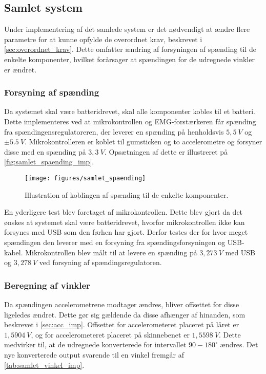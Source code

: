\subsection{Samlet system} \label{sec:samlet_system}
Under implementering af det samlede system er det nødvendigt at ændre flere parametre for at kunne opfylde de overordnet krav, beskrevet i  \autoref{sec:overordnet_krav}. Dette omfatter ændring af forsyningen af spænding til de enkelte komponenter, hvilket forårsager at spændingen for de udregnede vinkler er ændret.

\subsubsection{Forsyning af spænding}
Da systemet skal være batteridrevet, skal alle komponenter kobles til et batteri. Dette implementeres ved at mikrokontrollen og EMG-forstærkeren får spænding fra spændingensregulatoreren, der leverer en spænding på henholdsvis $5,5~V$ og $\pm 5.5~V$. Mikrokontrolleren er koblet til gumsticken og to accelerometre og forsyner disse med en spænding på $3,3~V$. Opsætningen af dette er illustreret på \autoref{fig:samlet_spaending_imp}. 

\begin{figure}[H]
\centering
\texttt{[image: figures/samlet\_spaending]}
\caption{Illustration af koblingen af spænding til de enkelte komponenter.}
\label{fig:samlet_spaending_imp}
\end{figure}

En yderligere test blev foretaget af mikrokontrollen. Dette blev gjort da det ønskes at systemet skal være batteridrevet, hvorfor mikrokontrollen ikke kan forsynes med USB som den førhen har gjort. Derfor testes der for hvor meget spændingen den leverer med en forsyning fra spændingsforsyningen og USB-kabel. Mikrokontrollen blev målt til at levere en spænding på $3,273~V$ med USB og $3,278~V$ ved forsyning af spændingsregulatoren.

\subsubsection{Beregning af vinkler}
Da spændingen accelerometrene modtager ændres, bliver offsettet for disse ligeledes ændret. Dette gør sig gældende da disse afhænger af hinanden, som  beskrevet i \autoref{sec:acc_imp}. Offsettet for accelerometeret placeret på låret er $1,5904~V$, og for accelerometeret placeret på skinnebenet er $1,5598~V$. Dette medvirker til, at de udregnede konverterede for intervallet $90-180^{\circ}$ ændres. Det nye konverterede output svarende til en vinkel fremgår af \autoref{tab:samlet_vinkel_imp}. 


